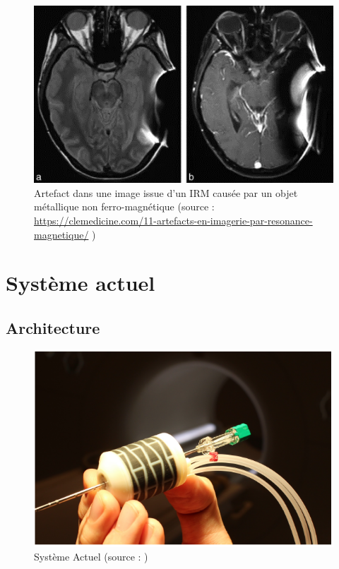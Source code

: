 \documentclass[10pt, a4paper]{article}
\begin{document}
\begin{figure}[ht!]
\centering
\includegraphics[scale=0.5]{ImageIntro/artefacts.png}
\caption{Artefact dans une image issue d'un IRM causée par un objet métallique non ferro-magnétique (source : \url{https://clemedicine.com/11-artefacts-en-imagerie-par-resonance-magnetique/} ) }
\label{fig:IRM-Artefact}
\end{figure}
    
\section{Système actuel} 

    \subsection{Architecture}
    
\begin{figure}[ht!]
\centering
\includegraphics[scale=0.5]{ImageIntro/Inchworm.PNG}
\caption{ Système Actuel (source : \cite{Pfeil2018})}
\label{fig:Inchworm}
\end{figure}   
\end{document}

